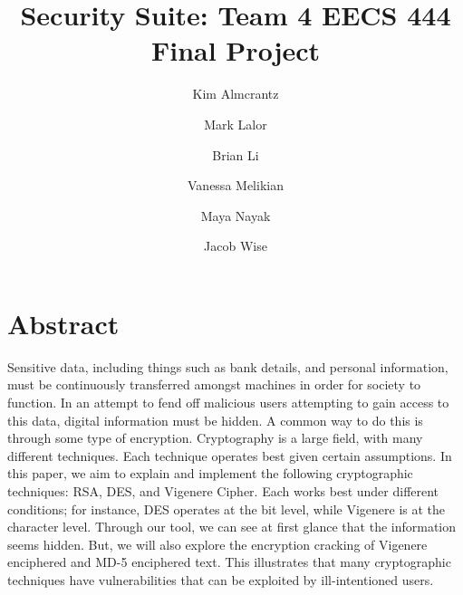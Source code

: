 \documentclass[acmlarge]{acmart}
\begin{document}
\title{Security Suite: Team 4 EECS 444 Final Project}

\author{Kim Almcrantz}

\author{Mark Lalor}

\author{Brian Li}

\author{Vanessa Melikian}

\author{Maya Nayak}

\author{Jacob Wise}


\maketitle


\section{Abstract}
Sensitive data, including things such as bank details, and personal information, must be continuously transferred amongst machines in order for society to function. In an attempt to fend off malicious users attempting to gain access to this data, digital information must be hidden. A common way to do this is through some type of encryption. Cryptography is a large field, with many different techniques. Each technique operates best given certain assumptions. In this paper, we aim to explain and implement the following cryptographic techniques: RSA, DES, and Vigenere Cipher. Each works best under different conditions; for instance, DES operates at the bit level, while Vigenere is at the character level. Through our tool, we can see at first glance that the information seems hidden. But, we will also explore the encryption cracking of Vigenere enciphered and MD-5 enciphered text. This illustrates that many cryptographic techniques have vulnerabilities that can be exploited by ill-intentioned users. 
\end{document}
